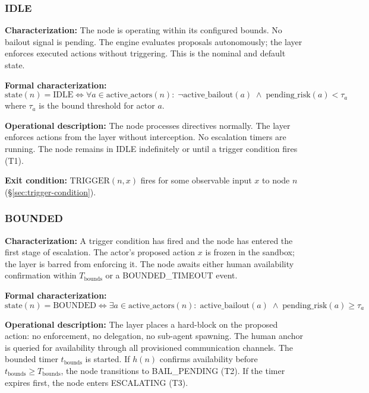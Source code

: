 \subsubsection{IDLE}

\textbf{Characterization:} The node is operating within its configured bounds. No bailout signal is pending. The \bounds{} engine evaluates proposals autonomously; the \fact{} layer enforces executed actions without triggering. This is the nominal and default state.

\textbf{Formal characterization:}
\[
\text{state}(n) = \text{IDLE} \iff
\forall a \in \text{active\_actors}(n):\;
\neg\text{active\_bailout}(a) \;\land\;
\text{pending\_risk}(a) < \tau_a
\]
where $\tau_a$ is the bound threshold for actor $a$.

\textbf{Operational description:} The node processes directives normally. The \fact{} layer enforces actions from the \purpose{} layer without interception. No escalation timers are running. The node remains in IDLE indefinitely or until a trigger condition fires (T1).

\textbf{Exit condition:} $\text{TRIGGER}(n, x)$ fires for some observable input $x$ to node $n$ (\S\ref{sec:trigger-condition}).

\subsubsection{BOUNDED}

\textbf{Characterization:} A trigger condition has fired and the node has entered the first stage of escalation. The actor's proposed action $x$ is frozen in the \bounds{} sandbox; the \fact{} layer is barred from enforcing it. The node awaits either human availability confirmation within $T_{\text{bounds}}$ or a BOUNDED\_TIMEOUT event.

\textbf{Formal characterization:}
\[
\text{state}(n) = \text{BOUNDED} \iff
\exists a \in \text{active\_actors}(n):\;
\text{active\_bailout}(a) \;\land\;
\text{pending\_risk}(a) \geq \tau_a
\]

\textbf{Operational description:} The \fact{} layer places a hard-block on the proposed action: no enforcement, no delegation, no sub-agent spawning. The human anchor is queried for availability through all provisioned communication channels. The bounded timer $t_{\text{bounds}}$ is started. If $h(n)$ confirms availability before $t_{\text{bounds}} \geq T_{\text{bounds}}$, the node transitions to BAIL\_PENDING (T2). If the timer expires first, the node enters ESCALATING (T3).

